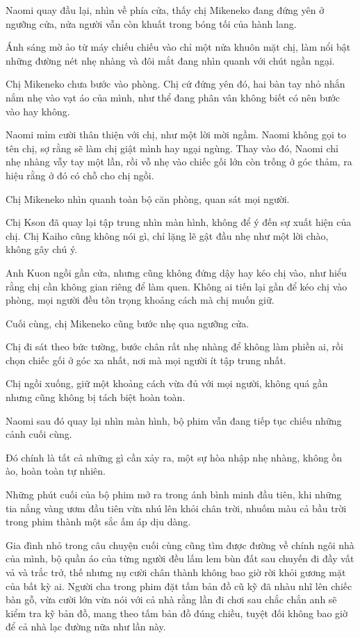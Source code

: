 \documentclass[../main.tex]{subfiles}
\begin{document}
Naomi quay đầu lại, nhìn về phía cửa, thấy chị Mikeneko đang đứng yên ở ngưỡng cửa, nửa người vẫn còn khuất trong bóng tối của hành lang.

Ánh sáng mờ ảo từ máy chiếu chiếu vào chỉ một nửa khuôn mặt chị, làm nổi bật những đường nét nhẹ nhàng và đôi mắt đang nhìn quanh với chút ngần ngại.

Chị Mikeneko chưa bước vào phòng. Chị cứ đứng yên đó, hai bàn tay nhỏ nhắn nắm nhẹ vào vạt áo của mình, như thể đang phân vân không biết có nên bước vào hay không.

Naomi mỉm cười thân thiện với chị, như một lời mời ngầm. Naomi không gọi to tên chị, sợ rằng sẽ làm chị giật mình hay ngại ngùng. Thay vào đó, Naomi chỉ nhẹ nhàng vẫy tay một lần, rồi vỗ nhẹ vào chiếc gối lớn còn trống ở góc thảm, ra hiệu rằng ở đó có chỗ cho chị ngồi.

Chị Mikeneko nhìn quanh toàn bộ căn phòng, quan sát mọi người.

Chị Kson đã quay lại tập trung nhìn màn hình, không để ý đến sự xuất hiện của chị. Chị Kaiho cũng không nói gì, chỉ lặng lẽ gật đầu nhẹ như một lời chào, không gây chú ý.

Anh Kuon ngồi gần cửa, nhưng cũng không đứng dậy hay kéo chị vào, như hiểu rằng chị cần không gian riêng để làm quen. Không ai tiến lại gần để kéo chị vào phòng, mọi người đều tôn trọng khoảng cách mà chị muốn giữ.

Cuối cùng, chị Mikeneko cũng bước nhẹ qua ngưỡng cửa.

Chị đi sát theo bức tường, bước chân rất nhẹ nhàng để không làm phiền ai, rồi chọn chiếc gối ở góc xa nhất, nơi mà mọi người ít tập trung nhất.

Chị ngồi xuống, giữ một khoảng cách vừa đủ với mọi người, không quá gần nhưng cũng không bị tách biệt hoàn toàn.

Naomi sau đó quay lại nhìn màn hình, bộ phim vẫn đang tiếp tục chiếu những cảnh cuối cùng.

Đó chính là tất cả những gì cần xảy ra, một sự hòa nhập nhẹ nhàng, không ồn ào, hoàn toàn tự nhiên.

\ct

Những phút cuối của bộ phim mở ra trong ánh bình minh đầu tiên, khi những tia nắng vàng ươm đầu tiên vừa nhú lên khỏi chân trời, nhuốm màu cả bầu trời trong phim thành một sắc ấm áp dịu dàng.

Gia đình nhỏ trong câu chuyện cuối cùng cũng tìm được đường về chính ngôi nhà của mình, bộ quần áo của từng người đều lấm lem bùn đất sau chuyến đi đầy vất vả và trắc trở, thế nhưng nụ cười chân thành không bao giờ rời khỏi gương mặt của bất kỳ ai. Người cha trong phim đặt tấm bản đồ cũ kỹ đã nhàu nhĩ lên chiếc bàn gỗ, vừa cười lớn vừa nói với cả nhà rằng lần đi chơi sau chắc chắn anh sẽ kiểm tra kỹ bản đồ, mang theo tấm bản đồ đúng chiều, tuyệt đối không bao giờ để cả nhà lạc đường nữa như lần này.
\end{document}
